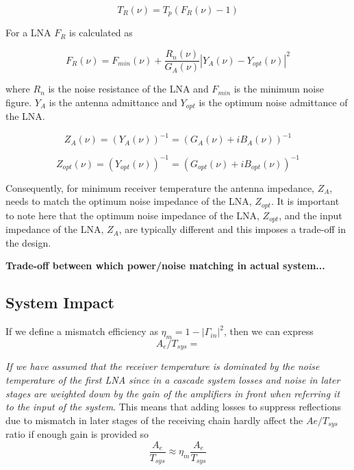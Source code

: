 \documentclass[11pt]{article}
\begin{document}
\begin{equation}
T_R(\nu) = T_p(F_R(\nu)-1)
\end{equation}

For a LNA $F_R$ is calculated as

\begin{equation}
F_R(\nu) = F_{min}(\nu)+\frac{R_n(\nu)}{G_A(\nu)}|Y_A(\nu)-Y_{opt}(\nu)|^2
\end{equation}

where $R_n$ is the noise resistance of the LNA and $F_{min}$ is the minimum noise figure. $Y_A$ is the antenna admittance and $Y_{opt}$ is the optimum noise admittance of the LNA. 

\begin{equation}
Z_A(\nu) = (Y_A(\nu))^{-1}= (G_A(\nu)+iB_A(\nu))^{-1}
\end{equation}

\begin{equation}
Z_{opt}(\nu) = (Y_{opt}(\nu))^{-1}= (G_{opt}(\nu)+iB_{opt}(\nu))^{-1}
\end{equation}

Consequently, for minimum receiver temperature the antenna impedance, $Z_A$, needs to match the optimum noise impedance of the LNA, $Z_{opt}$. It is important to note here that the optimum noise impedance of the LNA, $Z_{opt}$, and the input impedance of the LNA, $Z_A$, are typically different and this imposes a trade-off in the design.

{\bf Trade-off between which power/noise matching in actual system...}

\subsection{System Impact}
If we define a mismatch efficiency as $\eta_m = 1-|\Gamma_{in}|^2$, then we can express 
\begin{equation}
A_e/T_{sys} = 
\end{equation}

{\em If we have assumed that the receiver temperature is dominated by the noise temperature of the first LNA since in a cascade system losses and noise in later stages are weighted down by the gain of the amplifiers in front when referring it to the input of the system}. This means that adding losses to suppress reflections due to mismatch in later stages of the receiving chain hardly affect the $Ae/T_{sys}$ ratio if enough gain is provided so
\begin{equation}
\frac{A_e}{T_{sys}} \approx \eta_m\frac{A_e}{T_{sys}}
\end{equation}
\end{document}
